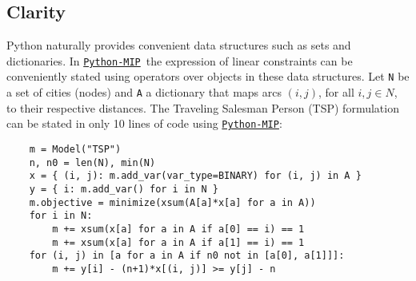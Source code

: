 \documentclass{article}
\def\PythonMIP{\href{https://github.com/coin-or/python-mip}{\texttt{Python-MIP}}}
\begin{document}
\subsection{Clarity}
Python naturally provides convenient data structures such as sets and dictionaries. 
In \PythonMIP\ the expression of linear constraints can be conveniently stated using operators over objects in these data structures. 
Let \texttt{N} be a set of cities (nodes) and \texttt{A} a dictionary that maps arcs $(i,j)$, for all $i,j\in N$, to their respective distances.
The Traveling Salesman Person (TSP) formulation \cite{Miller1960} can be stated in only 10 lines of code using \PythonMIP:

\begin{verbatim}
    m = Model("TSP")
    n, n0 = len(N), min(N)
    x = { (i, j): m.add_var(var_type=BINARY) for (i, j) in A }
    y = { i: m.add_var() for i in N }
    m.objective = minimize(xsum(A[a]*x[a] for a in A))
    for i in N:
        m += xsum(x[a] for a in A if a[0] == i) == 1
        m += xsum(x[a] for a in A if a[1] == i) == 1
    for (i, j) in [a for a in A if n0 not in [a[0], a[1]]]:
        m += y[i] - (n+1)*x[(i, j)] >= y[j] - n
\end{verbatim}
\end{document}
